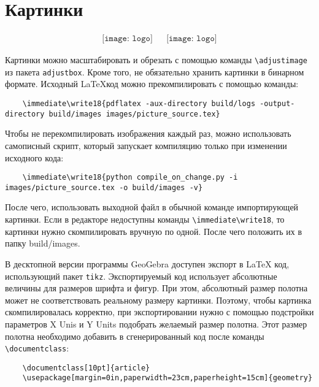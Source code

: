 \section{Картинки}

\begin{align*}
    \texttt{[image: logo]}
     &  &
    \texttt{[image: logo]}
\end{align*}
\begin{center}
\end{center}
Картинки можно масштабировать и обрезать с помощью команды \verb|\adjustimage| из пакета \verb|adjustbox|.
Кроме того, не обязательно хранить картинки в бинарном формате.
Исходный \LaTeX\:код можно прекомпилировать с помощью команды:
\begin{lstlisting}
    \immediate\write18{pdflatex -aux-directory build/logs -output-directory build/images images/picture_source.tex}
\end{lstlisting}
Чтобы не перекомпилировать изображения каждый раз, можно использовать самописный скрипт, который запускает компиляцию только при изменении исходного кода:
\begin{lstlisting}
    \immediate\write18{python compile_on_change.py -i images/picture_source.tex -o build/images -v}
\end{lstlisting}

После чего, использовать выходной файл в обычной команде импортирующей картинки.
Если в редакторе недоступны команды \verb|\immediate\write18|, то картинки нужно скомпилировать вручную по одной.
После чего положить их в папку build/images.

В десктопной версии программы GeoGebra доступен экспорт в \LaTeX\: код, использующий пакет \verb|tikz|.
Экспортируемый код использует абсолютные величины для размеров шрифта и фигур.
При этом, абсолютный размер полотна может не соответствовать реальному размеру картинки.
Поэтому, чтобы картинка скомпилировалась корректно, при экспортировании нужно с помощью подстройки параметров X Unis и Y Units подобрать желаемый размер полотна.
Этот размер полотна необходимо добавить в сгенерированный код после команды \verb|\documentclass|:
\begin{lstlisting}
    \documentclass[10pt]{article}
    \usepackage[margin=0in,paperwidth=23cm,paperheight=15cm]{geometry}
\end{lstlisting}

